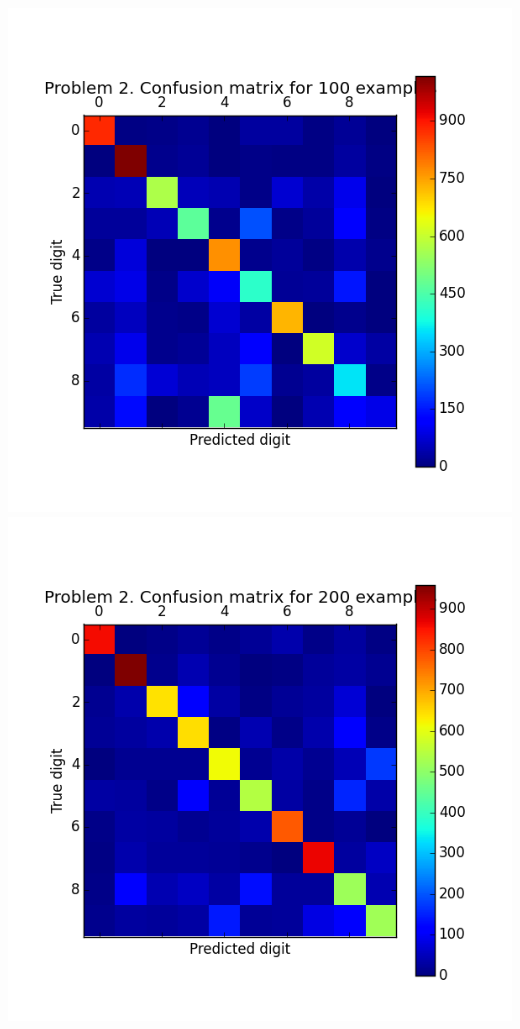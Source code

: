 \documentclass[11pt]{article}
\begin{document}
\includegraphics[scale=0.6]{figure2}
\includegraphics[scale=0.6]{figure3}
\end{document}
